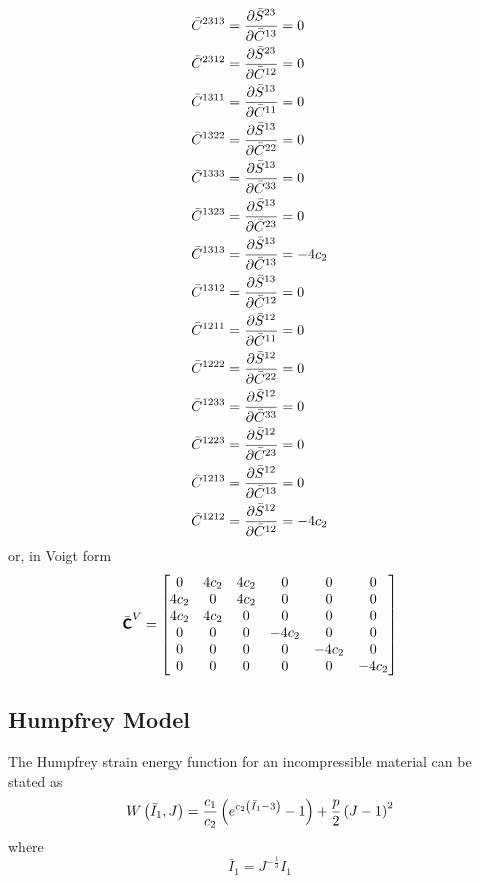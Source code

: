 \begin{equation}
\begin{split}
    \bar{C}^{2313}&= \dfrac{\partial \bar{S}^{23}}{\partial \bar{C}^{13}} =0\\
    \bar{C}^{2312}&= \dfrac{\partial \bar{S}^{23}}{\partial \bar{C}^{12}} =0\\
    \bar{C}^{1311}&= \dfrac{\partial \bar{S}^{13}}{\partial \bar{C}^{11}} =0\\
    \bar{C}^{1322}&= \dfrac{\partial \bar{S}^{13}}{\partial \bar{C}^{22}} =0\\
    \bar{C}^{1333}&= \dfrac{\partial \bar{S}^{13}}{\partial \bar{C}^{33}} =0\\
    \bar{C}^{1323}&= \dfrac{\partial \bar{S}^{13}}{\partial \bar{C}^{23}} =0\\
    \bar{C}^{1313}&= \dfrac{\partial \bar{S}^{13}}{\partial \bar{C}^{13}} =-4c_{2}\\
    \bar{C}^{1312}&= \dfrac{\partial \bar{S}^{13}}{\partial \bar{C}^{12}} =0\\
    \bar{C}^{1211}&= \dfrac{\partial \bar{S}^{12}}{\partial \bar{C}^{11}} =0\\
    \bar{C}^{1222}&= \dfrac{\partial \bar{S}^{12}}{\partial \bar{C}^{22}} =0\\
    \bar{C}^{1233}&= \dfrac{\partial \bar{S}^{12}}{\partial \bar{C}^{33}} =0\\
    \bar{C}^{1223}&= \dfrac{\partial \bar{S}^{12}}{\partial \bar{C}^{23}} =0\\
    \bar{C}^{1213}&= \dfrac{\partial \bar{S}^{12}}{\partial \bar{C}^{13}} =0\\
    \bar{C}^{1212}&= \dfrac{\partial \bar{S}^{12}}{\partial \bar{C}^{12}} =-4c_{2}\\
  \end{split}
\end{equation}
or, in Voigt form
\begin{equation}
  \bar{\boldsymbol{\mathsf{C}}}^{V}=\begin{bmatrix}
  0 & 4c_{2} & 4c_{2} & 0 & 0 & 0 \\
  4c_{2} & 0 & 4c_{2} & 0 & 0 & 0 \\
  4c_{2} & 4c_{2} & 0 & 0 & 0 & 0 \\
  0     & 0      & 0 & -4c_{2} & 0 & 0 \\
  0     & 0      & 0 & 0      & -4c_{2} & 0 \\
  0     & 0      & 0 & 0      & 0      & -4c_{2} 
  \end{bmatrix}
\end{equation}

\subsection{Humpfrey Model}

The Humpfrey strain energy function for an incompressible material can be
stated as
\begin{equation}
   W\left( \bar{I}_{1},J \right) =\dfrac{c_{1}}{c_{2}}\left( e^{c_{2}\left( \bar{I}_{1}-3 \right)}-1 \right)+\dfrac{p}{2}\left( J-1 \right)^{2}
\end{equation}
where
\begin{equation}
  \bar{I}_{1}=J^{-\frac{1}{3}}I_{1}
\end{equation}


